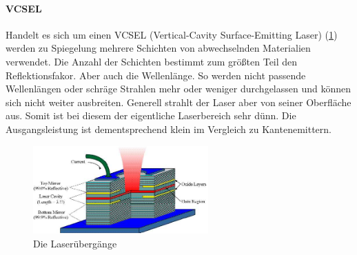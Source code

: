 	\paragraph{VCSEL}Handelt es sich um einen VCSEL (Vertical-Cavity Surface-Emitting Laser) (\ref{11_hllaser}) werden zu Spiegelung mehrere Schichten von abwechselnden Materialien verwendet. Die Anzahl der Schichten bestimmt zum größten Teil den Reflektionsfakor. Aber auch die Wellenlänge. So werden nicht passende Wellenlängen oder schräge Strahlen mehr oder weniger durchgelassen und können sich nicht weiter ausbreiten.
	Generell strahlt der Laser aber von seiner Oberfläche aus. Somit ist bei diesem der eigentliche Laserbereich sehr dünn. Die Ausgangsleistung ist dementsprechend klein im Vergleich zu Kantenemittern.
	\begin{figure}[h]
		\centering
		\includegraphics[width=0.6\textwidth]{Kapitel/Kap11/hllaser.png}
		\caption{Die Laserübergänge}
		\label{11_hllaser}
	\end{figure}
